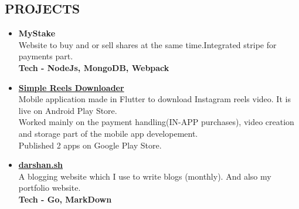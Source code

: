 \documentclass[line, margin, 12pt]{res}
\begin{document}
\begin{resume}
\section{PROJECTS}
\begin{itemize}
\item \textbf{{MyStake}}\\
Website to buy and or sell shares at the same time.Integrated stripe for payments part. \\
 \textbf{Tech - NodeJs,  MongoDB, Webpack}
\item \textbf{\href{https://play.google.com/store/apps/details?id=com.darshansharma.simple_reels_downloader}{Simple Reels Downloader}}\\
Mobile application made in Flutter to download Instagram reels video. It is live on Android Play Store.\\
Worked mainly on the payment handling(IN-APP purchases), video creation and storage part of the mobile app developement.\\
Published 2 apps on Google Play Store.\\
\item \textbf{\href{https://darshan.sh}{darshan.sh }}\\
A blogging website which I use to write blogs (monthly). And also my portfolio website. \\
 \textbf{Tech - Go, MarkDown}
\end{itemize}

\end{resume}
\end{document}
